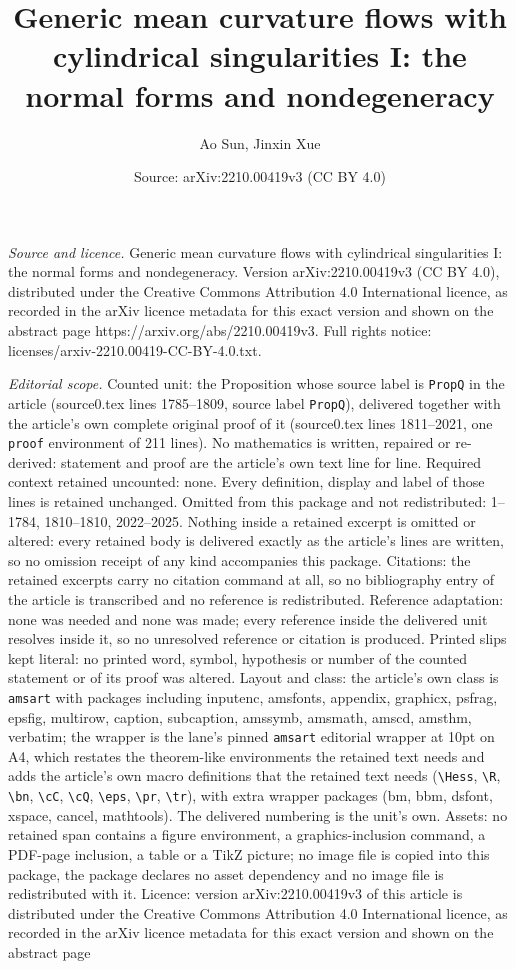 \documentclass[10pt,a4paper]{amsart}
\title[Generic mean curvature flows with cylindrical singularities ]{Generic mean curvature flows with cylindrical singularities I: the normal forms and nondegeneracy}
\author{Ao Sun, Jinxin Xue}
\date{Source: arXiv:2210.00419v3 (CC BY 4.0)}
\begin{document}
\maketitle

\noindent\emph{Source and licence.} Generic mean curvature flows with cylindrical singularities I: the normal forms and nondegeneracy. Version arXiv:2210.00419v3 (CC BY 4.0), distributed under the Creative Commons Attribution 4.0 International licence, as recorded in the arXiv licence metadata for this exact version and shown on the abstract page https://arxiv.org/abs/2210.00419v3. Full rights notice: licenses/arxiv-2210.00419-CC-BY-4.0.txt.\par\smallskip

\noindent\textit{Editorial scope.} Counted unit: the Proposition whose source label is \texttt{PropQ} in the article (source0.tex lines 1785--1809, source label \texttt{PropQ}), delivered together with the article's own complete original proof of it (source0.tex lines 1811--2021, one \texttt{proof} environment of 211 lines). No mathematics is written, repaired or re-derived: statement and proof are the article's own text line for line. Required context retained uncounted: none. Every definition, display and label of those lines is retained unchanged. Omitted from this package and not redistributed: 1--1784, 1810--1810, 2022--2025. Nothing inside a retained excerpt is omitted or altered: every retained body is delivered exactly as the article's lines are written, so no omission receipt of any kind accompanies this package. Citations: the retained excerpts carry no citation command at all, so no bibliography entry of the article is transcribed and no reference is redistributed. Reference adaptation: none was needed and none was made; every reference inside the delivered unit resolves inside it, so no unresolved reference or citation is produced. Printed slips kept literal: no printed word, symbol, hypothesis or number of the counted statement or of its proof was altered. Layout and class: the article's own class is \texttt{amsart} with packages including inputenc, amsfonts, appendix, graphicx, psfrag, epsfig, multirow, caption, subcaption, amssymb, amsmath, amscd, amsthm, verbatim; the wrapper is the lane's pinned \texttt{amsart} editorial wrapper at 10pt on A4, which restates the theorem-like environments the retained text needs and adds the article's own macro definitions that the retained text needs (\texttt{\textbackslash Hess}, \texttt{\textbackslash R}, \texttt{\textbackslash bn}, \texttt{\textbackslash cC}, \texttt{\textbackslash cQ}, \texttt{\textbackslash eps}, \texttt{\textbackslash pr}, \texttt{\textbackslash tr}), with extra wrapper packages (bm, bbm, dsfont, xspace, cancel, mathtools). The delivered numbering is the unit's own. Assets: no retained span contains a figure environment, a graphics-inclusion command, a PDF-page inclusion, a table or a TikZ picture; no image file is copied into this package, the package declares no asset dependency and no image file is redistributed with it. Licence: version arXiv:2210.00419v3 of this article is distributed under the Creative Commons Attribution 4.0 International licence, as recorded in the arXiv licence metadata for this exact version and shown on the abstract page 
\end{document}
